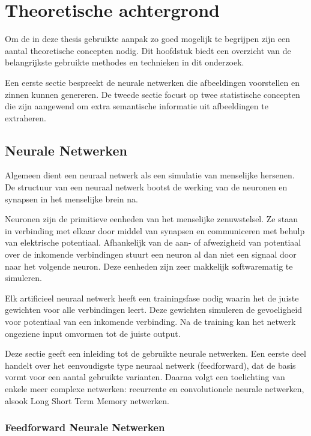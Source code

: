 \chapter{Theoretische achtergrond}
\label{hst-theorie}
Om de in deze thesis gebruikte aanpak zo goed mogelijk te begrijpen zijn een aantal theoretische concepten nodig. Dit hoofdstuk biedt een overzicht van de belangrijkste gebruikte methodes en technieken in dit onderzoek.

Een eerste sectie bespreekt de neurale netwerken die afbeeldingen voorstellen en zinnen kunnen genereren. De tweede sectie focust op twee statistische concepten die zijn aangewend om extra semantische informatie uit afbeeldingen te extraheren. 

\section{Neurale Netwerken}
Algemeen dient een neuraal netwerk als een simulatie van menselijke hersenen. De structuur van een neuraal netwerk bootst de werking van de neuronen en synapsen in het menselijke brein na. 

Neuronen zijn de primitieve eenheden van het menselijke zenuwstelsel. Ze staan in verbinding met elkaar door middel van synapsen en communiceren met behulp van elektrische potentiaal. Afhankelijk van de aan- of afwezigheid van potentiaal over de inkomende verbindingen stuurt een neuron al dan niet een signaal door naar het volgende neuron. Deze eenheden zijn zeer makkelijk softwarematig te simuleren.

Elk artificieel neuraal netwerk heeft een trainingsfase nodig waarin het de juiste gewichten voor alle verbindingen leert. Deze gewichten simuleren de gevoeligheid voor potentiaal van een inkomende verbinding. Na de training kan het netwerk ongeziene input omvormen tot de juiste output.

Deze sectie geeft een inleiding tot de gebruikte neurale netwerken. Een eerste deel handelt over het eenvoudigste type neuraal netwerk (feedforward), dat de basis vormt voor een aantal gebruikte varianten. Daarna volgt een toelichting van enkele meer complexe netwerken: recurrente en convolutionele neurale netwerken, alsook Long Short Term Memory netwerken.

\subsection{Feedforward Neurale Netwerken}

